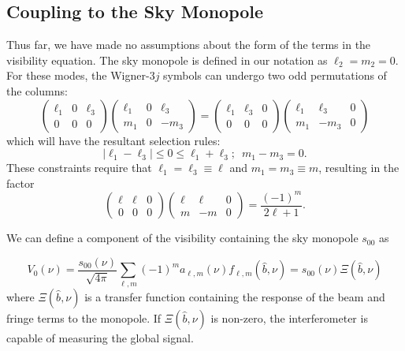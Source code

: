 \subsection{Coupling to the Sky Monopole}
Thus far, we have made no assumptions about the form of the terms in the visibility equation. The sky monopole is defined in our notation as $\ell_2 = m_2 = 0$. For these modes, the Wigner-$3j$ symbols can undergo two odd permutations of the columns:
\begin{equation}
\begin{pmatrix}
\ell_1 & 0 & \ell_3 \\
0 & 0 & 0
\end{pmatrix}
\begin{pmatrix}
\ell_1 & 0 & \ell_3 \\
m_1 & 0 & -m_3
\end{pmatrix}
=
\begin{pmatrix}
\ell_1 & \ell_3 & 0 \\
0 & 0 & 0
\end{pmatrix}
\begin{pmatrix}
\ell_1 & \ell_3 & 0 \\
m_1 & -m_3 & 0
\end{pmatrix}
\end{equation}
which will have the resultant selection rules:
\begin{equation}
| \ell_1 - \ell_3 | \leq 0 \leq \ell_1 + \ell_3;\,\,\,m_1 - m_3 = 0.
\end{equation}
These constraints require that $\ell_1 = \ell_3 \equiv \ell$ and $m_1 = m_3 \equiv m$, resulting in the factor
\begin{equation}
\begin{pmatrix}
\ell & \ell & 0 \\
0 & 0 & 0
\end{pmatrix}
\begin{pmatrix}
\ell & \ell & 0 \\
m & -m & 0
\end{pmatrix}
= \frac{(-1)^m}{2\ell + 1}.
\end{equation}

We can define a component of the visibility containing the sky monopole $s_{00}$ as 

\begin{equation}
V_0(\nu) = \frac{s_{00}(\nu)}{\sqrt{4\pi}} \sum_{\ell, m} (-1)^m a_{\ell, m}(\nu) f_{\ell,m}(\hat{b},\nu) = s_{00}(\nu)\Xi(\hat{b},\nu)
\label{eq:xi_def}
\end{equation}
where $\Xi(\hat{b},\nu)$ is a transfer function containing the response of the beam and fringe terms to the monopole. If $\Xi(\hat{b},\nu)$ is non-zero, the interferometer is capable of measuring the global signal.

